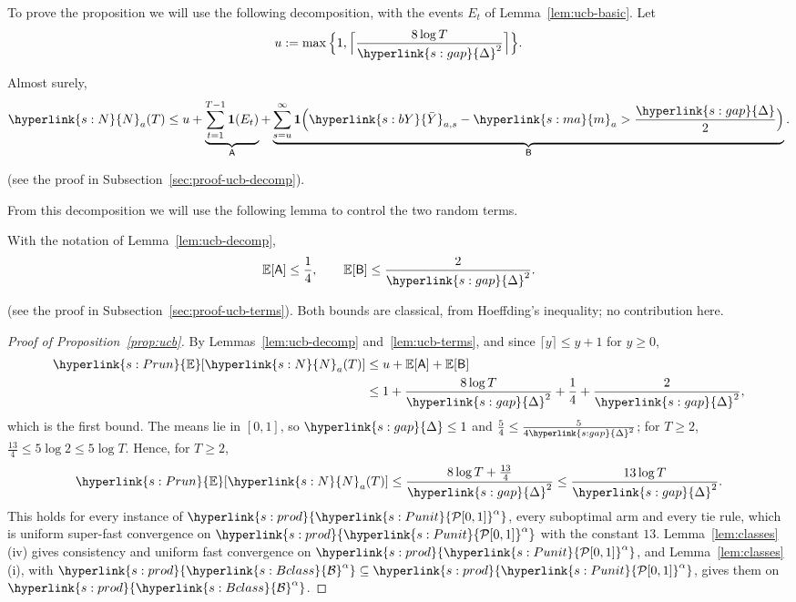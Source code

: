 \documentclass[11pt]{article}
\newcommand{\E}{\mathbb{E}}
\newcommand{\ind}{\mathbf{1}}
\newcommand{\sy}[2]{{\hyperlink{#1}{#2}}}
\newcommand{\Punit}{\sy{s:Punit}{\mathcal{P}[0,1]}}
\newcommand{\Bclass}{\sy{s:Bclass}{\mathcal{B}}}
\newcommand{\marm}{\sy{s:ma}{m}}
\newcommand{\gap}{\sy{s:gap}{\Delta}}
\newcommand{\powc}[1]{\sy{s:prod}{#1^{\alpha}}}
\newcommand{\Er}{\sy{s:Prun}{\E}}
\newcommand{\Np}{\sy{s:N}{N}}
\newcommand{\bY}{\sy{s:bY}{\bar{Y}}}
\begin{document}
To prove the proposition we will use the following decomposition, with the events $E_t$ of
Lemma~\ref{lem:ucb-basic}. Let
\begin{equation*}
  u:=\max\Big\{1,\Big\lceil\frac{8\log T}{\gap^2}\Big\rceil\Big\}.
\end{equation*}

\begin{lemma}[Decomposition]\label{lem:ucb-decomp}
Almost surely,
\begin{equation*}
  \Np_a(T)\le u+\underbrace{\sum_{t=1}^{T-1}\ind(E_t)}_{\mathsf A}
  +\underbrace{\sum_{s=u}^{\infty}\ind\Big(\bY_{a,s}-\marm_a>\frac{\gap}{2}\Big)}_{\mathsf B}.
\end{equation*}
\end{lemma}
(see the proof in Subsection~\ref{sec:proof-ucb-decomp}).

From this decomposition we will use the following lemma to control the two random terms.

\begin{lemma}\label{lem:ucb-terms}
With the notation of Lemma~\ref{lem:ucb-decomp},
\begin{equation*}
  \E[\mathsf A]\le\frac14,\qquad\E[\mathsf B]\le\frac{2}{\gap^2}.
\end{equation*}
\end{lemma}
(see the proof in Subsection~\ref{sec:proof-ucb-terms}). Both bounds are classical, from
Hoeffding's inequality; no contribution here.

\begin{proof}[Proof of Proposition~\ref{prop:ucb}]
By Lemmas~\ref{lem:ucb-decomp} and~\ref{lem:ucb-terms}, and since $\lceil y\rceil\le y+1$ for $y\ge0$,
\begin{align*}
  \Er[\Np_a(T)]&\le u+\E[\mathsf A]+\E[\mathsf B]\\
  &\le1+\frac{8\log T}{\gap^2}+\frac14+\frac{2}{\gap^2},
\end{align*}
which is the first bound. The means lie in $[0,1]$, so $\gap\le1$ and $\frac54\le\frac{5}{4\gap^2}$;
for $T\ge2$, $\frac{13}{4}\le5\log2\le5\log T$. Hence, for $T\ge2$,
\begin{equation*}
  \Er[\Np_a(T)]\le\frac{8\log T+\frac{13}{4}}{\gap^2}\le\frac{13\log T}{\gap^2}.
\end{equation*}
This holds for every instance of $\powc{\Punit}$, every suboptimal arm and every tie rule, which is
uniform super-fast convergence on $\powc{\Punit}$ with the constant $13$. Lemma~\ref{lem:classes}(iv)
gives consistency and uniform fast convergence on $\powc{\Punit}$, and Lemma~\ref{lem:classes}(i), with
$\powc{\Bclass}\subseteq\powc{\Punit}$, gives them on $\powc{\Bclass}$.
\end{proof}
\end{document}
